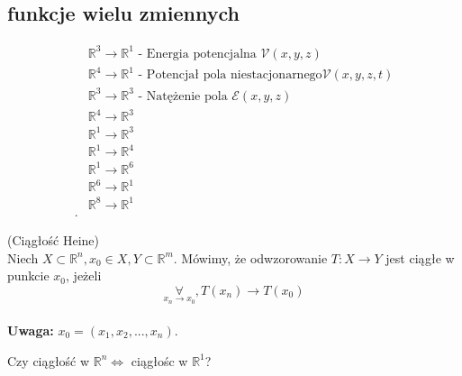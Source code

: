 \documentclass[../main.tex]{subfiles}
\begin{document}
\subsection{funkcje wielu zmiennych}

\begin{przyklad}
    \begin{align*}
        &\mathbb{R}^{3}\rightarrow\mathbb{R}^{1} \text{ - Energia potencjalna } \mathcal{V}(x,y,z)\\
        &\mathbb{R}^{4}\rightarrow\mathbb{R}^{1} \text{ - Potencjał pola niestacjonarnego} \mathcal{V}(x,y,z,t)\\
        &\mathbb{R}^{3}\rightarrow\mathbb{R}^{3} \text{ - Natężenie pola } \mathcal{E}(x,y,z) \\
        &\mathbb{R}^{4}\rightarrow\mathbb{R}^{3}\\
        &\mathbb{R}^{1}\rightarrow\mathbb{R}^{3}\\
        &\mathbb{R}^{1}\rightarrow\mathbb{R}^{4}\\
        &\mathbb{R}^{1}\rightarrow\mathbb{R}^{6}\\
        &\mathbb{R}^{6}\rightarrow\mathbb{R}^{1}\\
        &\mathbb{R}^{8}\rightarrow\mathbb{R}^{1}\\
    .\end{align*}
\end{przyklad}

\begin{definicja}
    (Ciągłość Heine)\\
Niech $X\subset\mathbb{R}^n, x_{0} \in X, Y\subset\mathbb{R}^m$. Mówimy, że odwzorowanie $T: X\rightarrow Y$ jest ciągłe w punkcie $x_0$, jeżeli $$\underset{x_n \to x_0}{\forall}, T(x_{n})\rightarrow T(x_{0})$$\\
    \textbf{Uwaga: } $x_{0} = (x_{1}, x_{2}, ..., x_{n})$.
\end{definicja}

\begin{pytanie}
    Czy ciągłość w $\mathbb{R}^{n} \iff$ ciągłośc w $\mathbb{R}^{1}$?
\end{pytanie}
\end{document}
